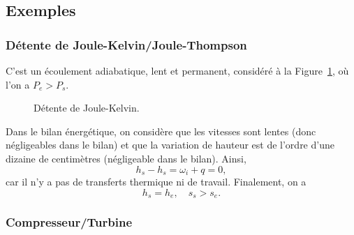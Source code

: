     \subsection{Exemples}
        \subsubsection{Détente de Joule-Kelvin/Joule-Thompson}

            C'est un écoulement adiabatique, lent et permanent, considéré à la Figure~\ref{fig:detente_joule_kelvin}, où l'on a $P_e>P_s$.

            \begin{figure}
                \centering
                \caption{Détente de Joule-Kelvin.}    
                \label{fig:detente_joule_kelvin}
            \end{figure}

            Dans le bilan énergétique, on considère que les vitesses sont lentes (donc négligeables dans le bilan) et que la variation de hauteur est de l'ordre d'une dizaine de centimètres (négligeable dans le bilan). Ainsi,
            \begin{equation}
                h_s-h_s=\omega_i+q=0,
            \end{equation}
            car il n'y a pas de transferts thermique ni de travail. Finalement, on a 
            \begin{equation}
                \boxed{
                    h_s=h_e,\quad s_s>s_e.
                }
            \end{equation}

        \subsubsection{Compresseur/Turbine}

